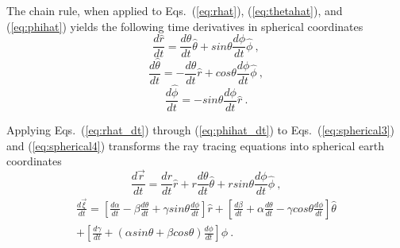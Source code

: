 \documentclass{ws-jca}
\begin{document}
The chain rule, when applied to Eqs.~(\ref{eq:rhat}), (\ref{eq:thetahat}),
and (\ref{eq:phihat}) yields the following time derivatives in spherical
coordinates
\begin{equation}
	\frac{d\hat{r}}{dt} = \frac{d\theta}{dt} \hat{\theta} 
		+ sin\theta \frac{d\phi}{dt} \hat{\phi} \:,
	\label{eq:rhat_dt} 
\end{equation}
\begin{equation}
	\frac{d\hat{\theta}}{dt} = - \frac{d\theta}{dt} \hat{r} 
		+ cos\theta \frac{d\phi}{dt} \hat{\phi} \:,
	\label{eq:thetahat_dt}
\end{equation}
\begin{equation}
	\frac{d\hat{\phi}}{dt} = - sin\theta \frac{d\phi}{dt} \hat{r} \:.
	\label{eq:phihat_dt}
\end{equation}

Applying Eqs.~(\ref{eq:rhat_dt}) through (\ref{eq:phihat_dt}) to
Eqs.~(\ref{eq:spherical3}) and (\ref{eq:spherical4}) transforms the ray
tracing equations into spherical earth coordinates
\begin{equation}
	\frac{d\vec{r}}{dt} = \frac{dr}{dt} \hat{r} + r \frac{d\theta}{dt} \hat{\theta} + r sin\theta \frac{d\phi}{dt} \hat{\phi} \:,
	\label{eq:rays_r}
\end{equation}
\begin{equation}
	\begin{split}
		\frac{d\vec{\xi}}{dt} = \left[ \frac{d\alpha}{dt} - \beta \frac{d\theta}{dt} 
			+ \gamma sin\theta \frac{d\phi}{dt} \right] \hat{r}
		  	+ \left[ \frac{d\beta}{dt} + \alpha \frac{d\theta}{dt} 
		  	- \gamma cos\theta \frac{d\phi}{dt} \right] \hat{\theta} \\ 
	  	+ \left[ \frac{d\gamma}{dt} + \left( \alpha sin\theta 
	  	+ \beta cos\theta \right) \frac{d\phi}{dt} \right] \hat{\phi} \:.
	  	\label{eq:rays_xi}
	\end{split}
\end{equation}
\end{document}
